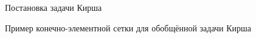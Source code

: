 \begin{figure}[ht]
    \caption{Постановка задачи Кирша}
    \label{fig:KirshProblem}
\end{figure}

\begin{figure}[ht]
    \caption{Пример конечно-элементной сетки для обобщённой задачи Кирша}
    \label{fig:KirshMesh}
\end{figure}

